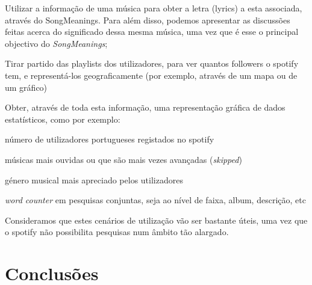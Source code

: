 \documentclass[twocolumn,twoside,11pt,a4paper]{article}
\begin{document}
\begin{compactitem}
  \item Utilizar a informação de uma música para obter a letra (lyrics) a esta associada,
    através do SongMeanings. Para além disso, podemos apresentar as discussões feitas
    acerca do significado dessa mesma música, uma vez que é esse o principal objectivo
    do \textit{SongMeanings};
  \item Tirar partido das playlists dos utilizadores, para ver quantos followers o
    spotify tem, e representá-los geograficamente (por exemplo, através de um mapa ou
    de um gráfico)
  \item Obter, através de toda esta informação, uma representação gráfica de dados
    estatísticos, como por exemplo:
    \begin{compactitem}
      \item número de utilizadores portugueses registados no spotify
      \item músicas mais ouvidas ou que são mais vezes avançadas (\textit{skipped})
      \item género musical mais apreciado pelos utilizadores
      \item \textit{word counter} em pesquisas conjuntas, seja ao nível de faixa, album,
        descrição, etc
    \end{compactitem}
\end{compactitem}

Consideramos que estes cenários de utilização vão ser bastante úteis, uma vez que o
spotify não possibilita pesquisas num âmbito tão alargado.


\section{Conclusões}\label{sec:conclusions}



%
%
%
%

\end{document}
